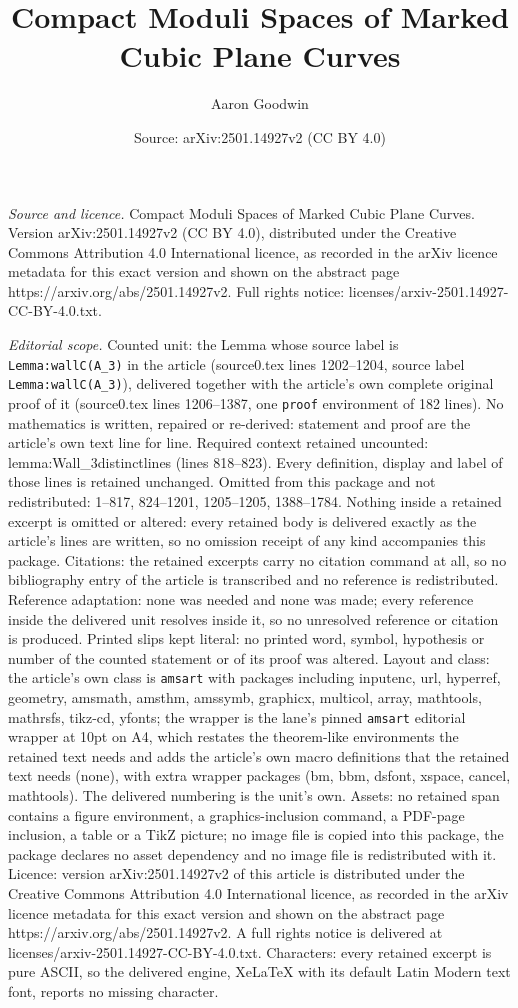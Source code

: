 \documentclass[10pt,a4paper]{amsart}
\title[Compact Moduli Spaces of Marked Cubic Plane Curves]{Compact Moduli Spaces of Marked Cubic Plane Curves}
\author{Aaron Goodwin}
\date{Source: arXiv:2501.14927v2 (CC BY 4.0)}
\begin{document}
\maketitle

\noindent\emph{Source and licence.} Compact Moduli Spaces of Marked Cubic Plane Curves. Version arXiv:2501.14927v2 (CC BY 4.0), distributed under the Creative Commons Attribution 4.0 International licence, as recorded in the arXiv licence metadata for this exact version and shown on the abstract page https://arxiv.org/abs/2501.14927v2. Full rights notice: licenses/arxiv-2501.14927-CC-BY-4.0.txt.\par\smallskip

\noindent\textit{Editorial scope.} Counted unit: the Lemma whose source label is \texttt{Lemma:wallC(A\_3)} in the article (source0.tex lines 1202--1204, source label \texttt{Lemma:wallC(A\_3)}), delivered together with the article's own complete original proof of it (source0.tex lines 1206--1387, one \texttt{proof} environment of 182 lines). No mathematics is written, repaired or re-derived: statement and proof are the article's own text line for line. Required context retained uncounted: lemma:Wall\_3distinctlines (lines 818--823). Every definition, display and label of those lines is retained unchanged. Omitted from this package and not redistributed: 1--817, 824--1201, 1205--1205, 1388--1784. Nothing inside a retained excerpt is omitted or altered: every retained body is delivered exactly as the article's lines are written, so no omission receipt of any kind accompanies this package. Citations: the retained excerpts carry no citation command at all, so no bibliography entry of the article is transcribed and no reference is redistributed. Reference adaptation: none was needed and none was made; every reference inside the delivered unit resolves inside it, so no unresolved reference or citation is produced. Printed slips kept literal: no printed word, symbol, hypothesis or number of the counted statement or of its proof was altered. Layout and class: the article's own class is \texttt{amsart} with packages including inputenc, url, hyperref, geometry, amsmath, amsthm, amssymb, graphicx, multicol, array, mathtools, mathrsfs, tikz-cd, yfonts; the wrapper is the lane's pinned \texttt{amsart} editorial wrapper at 10pt on A4, which restates the theorem-like environments the retained text needs and adds the article's own macro definitions that the retained text needs (none), with extra wrapper packages (bm, bbm, dsfont, xspace, cancel, mathtools). The delivered numbering is the unit's own. Assets: no retained span contains a figure environment, a graphics-inclusion command, a PDF-page inclusion, a table or a TikZ picture; no image file is copied into this package, the package declares no asset dependency and no image file is redistributed with it. Licence: version arXiv:2501.14927v2 of this article is distributed under the Creative Commons Attribution 4.0 International licence, as recorded in the arXiv licence metadata for this exact version and shown on the abstract page https://arxiv.org/abs/2501.14927v2. A full rights notice is delivered at licenses/arxiv-2501.14927-CC-BY-4.0.txt. Characters: every retained excerpt is pure ASCII, so the delivered engine, XeLaTeX with its default Latin Modern text font, reports no missing character.
\end{document}
